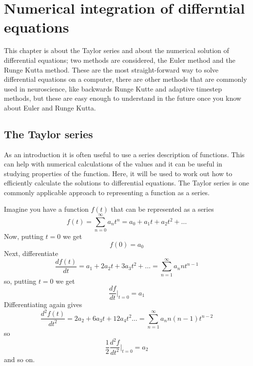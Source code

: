 \documentclass[12pt]{article}
\begin{document}
\section*{Numerical integration of differntial equations} 

This chapter is about the Taylor series and about the numerical
solution of differential equations; two methods are considered, the
Euler method and the Runge Kutta method. These are the most
straight-forward way to solve differential equations on a computer,
there are other methods that are commonly used in neuroscience, like
backwards Runge Kutte and adaptive timestep methods, but these are
easy enough to understand in the future once you know about Euler and
Runge Kutta.

\subsection*{The Taylor series}

As an introduction it is often useful to use a series description of
functions. This can help with numerical calculations of the values and
it can be useful in studying properties of the function. Here, it will
be used to work out how to efficiently calculate the solutions to
differential equations. The Taylor series is one commonly applicable
approach to representing a function as a series.

Imagine you have a function $f(t)$ that can be represented as a series
\begin{equation}
f(t)=\sum_{n=0}^\infty{a_nt^n}=a_0+a_1t+a_2t^2+\ldots
\end{equation}
Now, putting $t=0$ we get
\begin{equation}
f(0)=a_0
\end{equation}
Next, differentiate
\begin{equation}
\frac{df(t)}{dt}=a_1+2a_2t+3a_3t^2+\ldots=\sum_{n=1}^\infty{a_nnt^{n-1}}
\end{equation}
so, putting $t=0$ we get
\begin{equation}
\frac{df}{dt}|_{t=0}=a_1
\end{equation}
Differentiating again gives
\begin{equation}
\frac{d^2f(t)}{dt^2}=2a_2+6a_3t+12a_4t^2\ldots=\sum_{n=1}^\infty{a_nn(n-1)t^{n-2}}
\end{equation}
so
\begin{equation}
\frac{1}{2}\frac{d^2f}{dt^2}|_{t=0}=a_2
\end{equation}
and so on.
\end{document}
